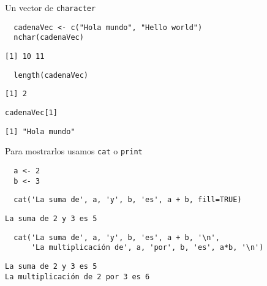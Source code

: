 \documentclass[xcolor={usenames,svgnames,dvipsnames}]{beamer}
\begin{document}
\begin{frame}[fragile,label=sec-3-2]{Un vector de \texttt{character}}
 \lstset{language=R,label= ,caption= ,numbers=none}
\begin{lstlisting}
  cadenaVec <- c("Hola mundo", "Hello world")
  nchar(cadenaVec)
\end{lstlisting}

\begin{verbatim}
[1] 10 11
\end{verbatim}

\lstset{language=R,label= ,caption= ,numbers=none}
\begin{lstlisting}
  length(cadenaVec)
\end{lstlisting}

\begin{verbatim}
[1] 2
\end{verbatim}

\lstset{language=R,label= ,caption= ,numbers=none}
\begin{lstlisting}
cadenaVec[1]
\end{lstlisting}

\begin{verbatim}
[1] "Hola mundo"
\end{verbatim}
\end{frame}

\begin{frame}[fragile,label=sec-3-3]{Para mostrarlos usamos \texttt{cat} o \texttt{print}}
 \lstset{language=R,label= ,caption= ,numbers=none}
\begin{lstlisting}
  a <- 2
  b <- 3
\end{lstlisting}

\lstset{language=R,label= ,caption= ,numbers=none}
\begin{lstlisting}
  cat('La suma de', a, 'y', b, 'es', a + b, fill=TRUE)
\end{lstlisting}

\begin{verbatim}
La suma de 2 y 3 es 5
\end{verbatim}

\lstset{language=R,label= ,caption= ,numbers=none}
\begin{lstlisting}
  cat('La suma de', a, 'y', b, 'es', a + b, '\n',
      'La multiplicación de', a, 'por', b, 'es', a*b, '\n')
\end{lstlisting}

\begin{verbatim}
La suma de 2 y 3 es 5 
La multiplicación de 2 por 3 es 6
\end{verbatim}
\end{frame}
\end{document}
